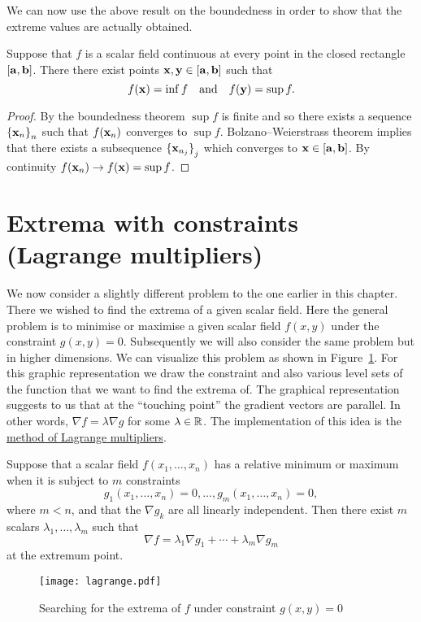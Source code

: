 We can now use the above result on the boundedness in order to show that the  extreme values are actually obtained.

\begin{theorem}
    Suppose that \(f\) is a scalar field continuous at every point in the closed rectangle \([\mathbf{a},\mathbf{b}]\).
    There there exist points \( \mathbf{x}, \mathbf{y} \in [\mathbf{a},\mathbf{b}]\) such that
    \[
        f(\mathbf{x}) = \inf f
        \quad \text{and} \quad
        f(\mathbf{y})= \sup f.
    \]
\end{theorem}

\begin{proof}
    By the boundedness theorem \(\sup f\) is finite and so there exists a sequence  \({\{\mathbf{x}_{n}\}}_{n}\)  such that \(f(\mathbf{x}_n)\) converges to \(\sup f\).
    Bolzano–Weierstrass theorem implies that there exists a subsequence  \({\{\mathbf{x}_{n_j}\}}_{j}\) which converges to \( \mathbf{x} \in [\mathbf{a},\mathbf{b}]\).
    By continuity \(f(\mathbf{x}_n) \to f(\mathbf{x}) = \sup f\).
\end{proof}




\section{Extrema with constraints (Lagrange multipliers)}

We now consider a slightly different problem to the one earlier in this chapter.
There we wished to find the extrema of a given scalar field.
Here the general problem is to minimise or maximise a given scalar field \(f(x,y)\) under the constraint \(g(x,y) = 0\).
Subsequently we will also consider the same problem but in higher dimensions.
We can visualize this problem as shown in Figure~\ref{fig:lagrange}.
For this graphic representation we draw the constraint and also various level sets of the function that we want to find the extrema of.
The graphical representation suggests to us that at the ``touching point'' the gradient vectors are parallel.
In other words, \(\nabla f = \lambda \nabla g\) for some \(\lambda \in \mathbb{R}\).
The implementation of this idea is the \href{https://en.wikipedia.org/wiki/Lagrange_multiplier}{method of Lagrange multipliers}.


\begin{theorem}
    Suppose that a scalar field \(f(x_1,\ldots,x_n)\) has a relative minimum or maximum when it is subject to \(m\) constraints
    \[
        g_1(x_1,\ldots,x_n) = 0,
        \dots , g_m(x_1,\ldots,x_n)=0,
    \]
    where \(m<n\), and that the \(\nabla g_k\) are all linearly independent.
    Then there exist \(m\) scalars \(\lambda_1,\ldots,\lambda_m\) such that
    \[
        \nabla f = \lambda_1 \nabla g_1 + \cdots + \lambda_m \nabla g_m
    \]
    at the extremum point.
\end{theorem}

\begin{figure}[htb]
    \begin{center}
        \texttt{[image: lagrange.pdf]}
        \caption{Searching for the extrema of \(f\) under constraint \(g(x,y)=0\)}
        \label{fig:lagrange}
    \end{center}
\end{figure}




